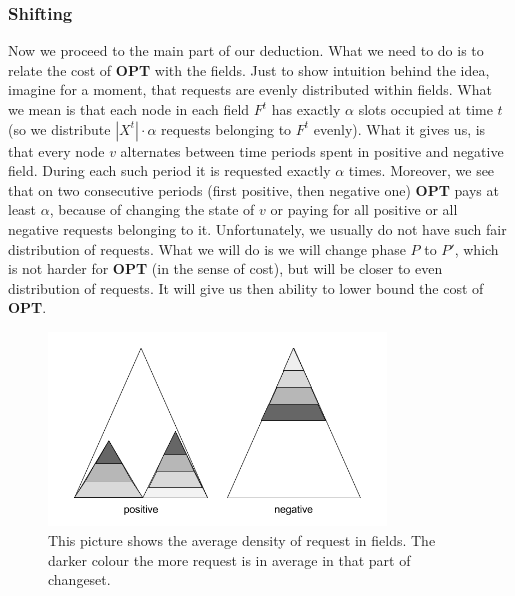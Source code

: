 \subsubsection{Shifting}
Now we proceed to the main part of our deduction. What we need to do is to 
relate the cost of \textbf{OPT} with the fields. Just to show intuition behind the 
idea, imagine 
for a moment, that requests are evenly distributed within fields. What we mean
is that each node in each field $F^t$ has exactly $\alpha$ slots 
occupied at time $t$ (so we distribute $|X^t| \cdot \alpha$ requests belonging 
to $F^t$ evenly). What it gives us, is that every node $v$ alternates between 
time periods spent in positive and negative field. During each such period it is 
requested exactly $\alpha$ times. Moreover, we see that on two consecutive 
periods (first positive, then negative one) \textbf{OPT} pays at least $\alpha$, 
because of changing 
the state of $v$ or paying for all positive or all negative requests belonging to it. 
Unfortunately, we usually do not have such fair distribution of requests. What we 
will do is 
we will change phase $P$ to $P'$, which is not harder for \textbf{OPT} (in the sense
of cost), but will be closer to even distribution of requests. It will give us then 
ability to lower bound the cost of \textbf{OPT}.
\begin{figure}
 \begin{center}
  \includegraphics[width=0.8\textwidth]{density_pic.png}
\end{center}
\caption{This picture shows the average density of request in fields. The 
darker colour the more request is in average in that part of changeset.}
\label{fig:density}
\end{figure}

